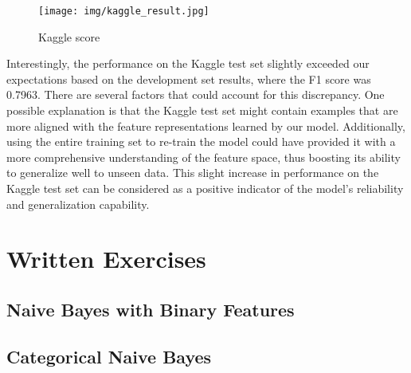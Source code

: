 \documentclass{article}
\begin{document}
\begin{figure}[!htbp]
    \centering
    \texttt{[image: img/kaggle\_result.jpg]}
    \caption{Kaggle score}
    \label{fig:kaggle-score}
\end{figure}

Interestingly, the performance on the Kaggle test set slightly exceeded our expectations based on the development set results, where the F1 score was 0.7963. There are several factors that could account for this discrepancy. One possible explanation is that the Kaggle test set might contain examples that are more aligned with the feature representations learned by our model. Additionally, using the entire training set to re-train the model could have provided it with a more comprehensive understanding of the feature space, thus boosting its ability to generalize well to unseen data. This slight increase in performance on the Kaggle test set can be considered as a positive indicator of the model's reliability and generalization capability.


\section{Written Exercises}

\subsection{Naive Bayes with Binary Features}

\subsection{Categorical Naive Bayes}
\end{document}
